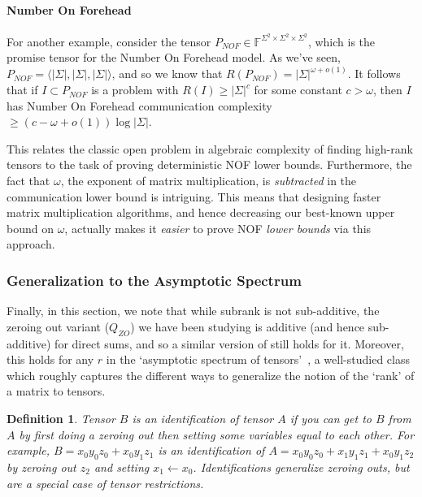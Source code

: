 \documentclass[10pt,a4paper]{article}
\newtheorem{definition}[theorem]{Definition}
\newcommand{\F}{\mathbb{F}}
\begin{document}
\paragraph{Number On Forehead}
For another example, consider the tensor $P_{NOF} \in \F^{\Sigma^2 \times \Sigma^2 \times \Sigma^2}$, which is the promise tensor for the Number On Forehead model. As we've seen, $P_{NOF} = \langle |\Sigma|, |\Sigma|, |\Sigma| \rangle$, and so we know that $R(P_{NOF}) = |\Sigma|^{\omega + o(1)}$. It follows that if $I \subset P_{NOF}$ is a problem with $R(I) \geq |\Sigma|^{c}$ for some constant $c > \omega$, then $I$ has Number On Forehead communication complexity $\geq (c - \omega + o(1)) \log |\Sigma|$. 

This relates the classic open problem in algebraic complexity of finding high-rank tensors to the task of proving deterministic NOF lower bounds. Furthermore, the fact that $\omega$, the exponent of matrix multiplication, is \emph{subtracted} in the communication lower bound is intriguing. This means that designing faster matrix multiplication algorithms, and hence decreasing our best-known upper bound on $\omega$, actually makes it \emph{easier} to prove NOF \emph{lower bounds} via this approach.


\subsubsection{Generalization to the Asymptotic Spectrum}

Finally, in this section, we note that while subrank is not sub-additive, the zeroing out variant ($Q_{ZO}$) we have been studying is additive (and hence sub-additive) for direct sums, and so a similar version of  still holds for it. Moreover, this holds for any $r$ in the `asymptotic spectrum of tensors'~\cite{S86,WZ22}, a well-studied class which roughly captures the different ways to generalize the notion of the `rank' of a matrix to tensors.

\begin{definition}
    Tensor $B$ is an \emph{identification} of tensor $A$ if you can get to $B$ from $A$ by first doing a zeroing out then setting some variables equal to each other. For example, $B = x_0 y_0 z_0 + x_0 y_1 z_1$ is an identification of $A = x_0 y_0 z_0 + x_1 y_1 z_1 + x_0 y_1 z_2$ by zeroing out $z_2$ and setting $x_1 \leftarrow x_0$. Identifications generalize zeroing outs, but are a special case of tensor restrictions.
\end{definition}
\end{document}
